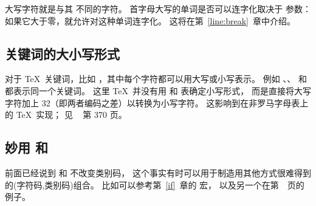 \documentclass{book}
\begin{document}
大写字符就是与其  不同的字符。
首字母大写的单词是否可以连字化取决于  参数：
如果它大于零，就允许对这种单词连字化。
这将在第~\ref{line:break}~章中介绍。

\subsection{关键词的大小写形式}

对于 \TeX\ 关键词，比如 ，其中每个字符都可以用大写或小写表示。
例如  、、 和  都表示同一个关键词。
这里 \TeX\ 并没有用  和  表确定小写形式，
而是直接将大写字符加上 32（即两者编码之差）以转换为小写字符。
这影响到在非罗马字母表上的 \TeX\ 实现；
见 \TeXbook\ \cite{Knuth:TeXbook} 第 370 页。

\subsection{妙用  和 }

前面已经说到  和  不改变类别码，
这个事实有时可以用于制造用其他方式很难得到的(字符码,类别码)组合。
比如可以参考第~\ref{if}~章的  宏，
以及另一个在第~\pageref{spsb:truc}~页的例子。
\end{document}
